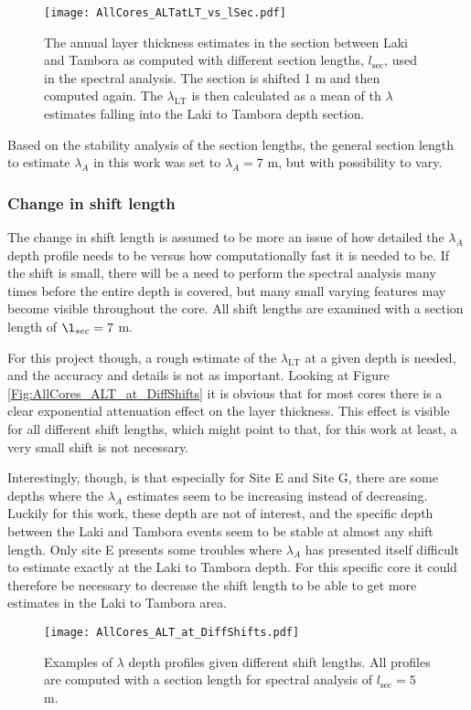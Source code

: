 \documentclass[../../CompleteThesis2/Complete_2ndDraft]{subfiles}
\begin{document}
\begin{figure}[h]
	\centering
	\texttt{[image: AllCores\_ALTatLT\_vs\_lSec.pdf]}
	\caption[$\lambda_{\text{LT}}$ vs. Section Length]{\small The annual layer thickness estimates in the section between Laki and Tambora as computed with different section lengths, $l_{\text{sec}}$, used in the spectral analysis. The section is shifted 1 m and then computed again. The $\lambda_{\text{LT}}$ is then calculated as a mean of th $\lambda$ estimates falling into the Laki to Tambora depth section.}
	\label{fig:AllCores_ALTatLT_vs_lSec}
\end{figure}

Based on the stability analysis of the section lengths, the general section length to estimate $\lambda_A$ in this work was set to $\lambda_A=7$ m, but with possibility to vary.


\subsubsection[Change in $l_{shift}$]{Change in shift length}
\label{Subsubsec:SignalAnalysis_SpectralAnalysis_ALT_lshift}
The change in shift length is assumed to be more an issue of how detailed the $\lambda_A$ depth profile needs to be versus how computationally fast it is needed to be. If the shift is small, there will be a need to perform the spectral analysis many times before the entire depth is covered, but many small varying features may become visible throughout the core. All shift lengths are examined with a section length of $\l_{sec}=7$ m.

For this project though, a rough estimate of the $\lambda_{\text{LT}}$ at a given depth is needed, and the accuracy and details is not as important. Looking at Figure \ref{Fig:AllCores_ALT_at_DiffShifts} it is obvious that for most cores there is a clear exponential attenuation effect on the layer thickness. This effect is visible for all different shift lengths, which might point to that, for this work at least, a very small shift is not necessary.

Interestingly, though, is that especially for Site E and Site G, there are some depths where the $\lambda_A$ estimates seem to be increasing instead of decreasing. Luckily for this work, these depth are not of interest, and the specific depth between the Laki and Tambora events seem to be stable at almost any shift length. Only site E presents some troubles where $\lambda_A$ has presented itself difficult to estimate exactly at the Laki to Tambora depth. For this specific core it could therefore be necessary to decrease the shift length to be able to get more estimates in the Laki to Tambora area.
\begin{figure}[h]
	\centering
	\texttt{[image: AllCores\_ALT\_at\_DiffShifts.pdf]}
	\caption[$\lambda$ Depth Profiles, Different $s_{\text{sec}}$]{\small Examples of $\lambda$ depth profiles given different shift lengths. All profiles are computed with a section length for spectral analysis of $l_{\text{sec}}=5$ m.}
	\label{fig:AllCores_ALT_at_DiffShifts}
\end{figure}
\end{document}
